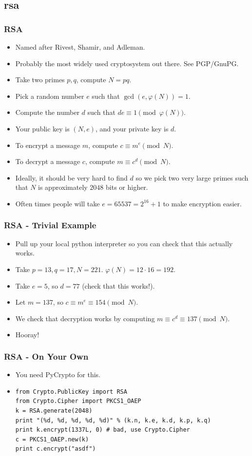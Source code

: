\documentclass[aspectratio=169,t]{beamer}
\begin{document}
\subsection{rsa}
\begin{frame}
\frametitle{RSA}
\begin{itemize}
\item
Named after Rivest, Shamir, and Adleman.
\item
Probably the most widely used cryptosystem out there. See PGP/GnuPG. \pause
\item
Take two primes $p, q$, compute $N = pq$. \pause
\item
Pick a random number $e$ such that $\gcd(e, \varphi(N)) = 1$. \pause
\item
Compute the number $d$ such that $de \equiv 1 \pmod{\varphi(N)}$. \pause
\item
Your public key is $(N, e)$, and your private key is $d$. \pause
\item
To encrypt a message $m$, compute $c \equiv m^e \pmod{N}$. \pause
\item
To decrypt a message $c$, compute $m \equiv c^d \pmod{N}$. \pause
\item
Ideally, it should be very hard to find $d$ so we pick two very large primes
such that $N$ is approximately $2048$ bits or higher.
\item
Often times people will take $e = 65537 = 2^{16} + 1$ to make encryption easier.
\end{itemize}
\end{frame}

\begin{frame}
\frametitle{RSA - Trivial Example}
\begin{itemize}
\item
Pull up your local python interpreter so you can check that this actually works.
\pause
\item
Take $p = 13, q = 17, N = 221$. $\varphi(N) = 12 \cdot 16 = 192$. \pause
\item
Take $e = 5$, so $d = 77$ (check that this works!). \pause
\item
Let $m = 137$, so $c \equiv m^e \equiv 154 \pmod{N}$. \pause
\item
We check that decryption works by computing $m \equiv c^d \equiv 137 \pmod{N}$.
\pause
\item
Hooray!
\end{itemize}
\end{frame}

\begin{frame}[fragile]
\frametitle{RSA - On Your Own}
\begin{itemize}
\item
You need PyCrypto for this.
\item
\begin{lstlisting}
from Crypto.PublicKey import RSA
from Crypto.Cipher import PKCS1_OAEP
k = RSA.generate(2048)
print "(%d, %d, %d, %d, %d)" % (k.n, k.e, k.d, k.p, k.q)
print k.encrypt(1337L, 0) # bad, use Crypto.Cipher
c = PKCS1_OAEP.new(k)
print c.encrypt("asdf")
\end{lstlisting}
\end{itemize}
\end{frame}
\end{document}
